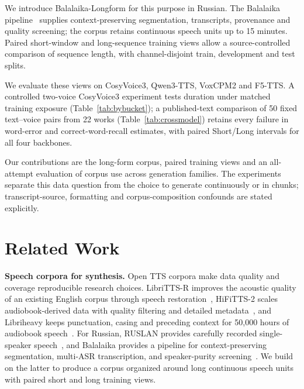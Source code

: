 \documentclass{article}
\newcommand{\corpus}{Balalaika-Longform}
\begin{document}
We introduce \corpus{} for this purpose in Russian. The Balalaika
pipeline~\cite{borodin2026balalaika} supplies context-preserving segmentation,
transcripts, provenance and quality screening; the corpus retains continuous
speech units up to 15 minutes. Paired short-window and long-sequence training
views allow a source-controlled comparison of sequence length, with channel-disjoint
train, development and test splits.

We evaluate these views on CosyVoice3, Qwen3-TTS, VoxCPM2 and F5-TTS. A controlled
two-voice CosyVoice3 experiment tests duration under matched training exposure
(Table~\ref{tab:bybucket}); a published-text comparison of 50 fixed text--voice
pairs from 22 works (Table~\ref{tab:crossmodel}) retains every failure in
word-error and correct-word-recall estimates, with paired Short/Long intervals
for all four backbones.

Our contributions are the long-form corpus, paired training views and an
all-attempt evaluation of corpus use across generation families. The experiments
separate this data question from the choice to generate continuously or in chunks;
transcript-source, formatting and corpus-composition confounds are stated explicitly.


\section{Related Work}
\label{sec:related}

\noindent\textbf{Speech corpora for synthesis.}
Open TTS corpora make data quality and coverage reproducible research choices.
LibriTTS-R improves the acoustic quality of an existing English corpus through speech
restoration~\cite{koizumi2023librittsr}, HiFiTTS-2 scales audiobook-derived data
with quality filtering and detailed metadata~\cite{langman2025hifitts2}, and
Libriheavy keeps punctuation, casing and preceding context for 50,000 hours of
audiobook speech~\cite{kang2024libriheavy}.
For Russian, RUSLAN provides carefully recorded single-speaker
speech~\cite{gabdrakhmanov2019ruslan}, and Balalaika provides a pipeline for
context-preserving segmentation, multi-ASR transcription, and speaker-purity
screening~\cite{borodin2026balalaika}.  We build on the latter to produce a corpus
organized around long continuous speech units with paired short and long training views.
\end{document}
